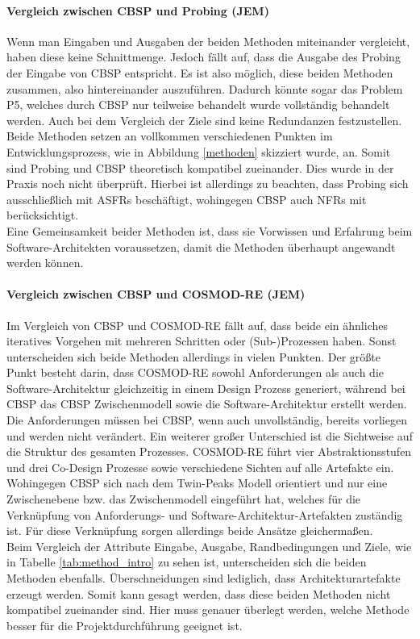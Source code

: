 \paragraph{Vergleich zwischen CBSP und Probing (JEM)}
Wenn man Eingaben und Ausgaben der beiden Methoden miteinander vergleicht, haben diese keine Schnittmenge. Jedoch f\"allt auf, dass die Ausgabe des Probing der Eingabe von CBSP entspricht. Es ist also m\"oglich, diese beiden Methoden zusammen, also hintereinander auszuf\"uhren. Dadurch k\"onnte sogar das Problem P5, welches durch CBSP nur teilweise behandelt wurde vollst\"andig behandelt werden. Auch bei dem Vergleich der Ziele sind keine Redundanzen festzustellen. Beide Methoden setzen an vollkommen verschiedenen Punkten im Entwicklungsprozess, wie in Abbildung \ref{methoden} skizziert wurde, an. Somit sind Probing und CBSP theoretisch kompatibel zueinander. Dies wurde in der Praxis noch nicht \"uberpr\"uft. Hierbei ist allerdings zu beachten, dass Probing sich ausschlie\ss{}lich mit ASFRs besch\"aftigt, wohingegen CBSP auch NFRs mit ber\"ucksichtigt. \\ 

Eine Gemeinsamkeit beider Methoden ist, dass sie Vorwissen und Erfahrung beim Software-Architekten voraussetzen, damit die Methoden \"uberhaupt angewandt werden k\"onnen. \\

\paragraph{Vergleich zwischen CBSP und COSMOD-RE (JEM)}
Im Vergleich von CBSP und COSMOD-RE f\"allt auf, dass beide ein \"ahnliches iteratives Vorgehen mit mehreren Schritten oder (Sub-)Prozessen haben. Sonst unterscheiden sich beide Methoden allerdings in vielen Punkten. Der gr\"o\ss{}te Punkt besteht darin, dass COSMOD-RE sowohl Anforderungen als auch die Software-Architektur gleichzeitig in einem Design Prozess generiert, w\"ahrend bei CBSP das CBSP Zwischenmodell sowie die Software-Architektur erstellt werden. Die Anforderungen m\"ussen bei CBSP, wenn auch unvollst\"andig, bereits vorliegen und werden nicht ver\"andert. Ein weiterer gro\ss{}er Unterschied ist die Sichtweise auf die Struktur des gesamten Prozesses. COSMOD-RE f\"uhrt vier Abstraktionsstufen und drei Co-Design Prozesse sowie verschiedene Sichten auf alle Artefakte ein. Wohingegen CBSP sich nach dem Twin-Peaks Modell orientiert und nur eine Zwischenebene bzw. das Zwischenmodell eingef\"uhrt hat, welches f\"ur die Verkn\"upfung von Anforderungs- und Software-Architektur-Artefakten zust\"andig ist. F\"ur diese Verkn\"upfung sorgen allerdings beide Ans\"atze gleicherma\ss{}en. \\
Beim Vergleich der Attribute Eingabe, Ausgabe, Randbedingungen und Ziele, wie in Tabelle \ref{tab:method_intro} zu sehen ist, unterscheiden sich die beiden Methoden ebenfalls. \"Uberschneidungen sind lediglich, dass Architekturartefakte erzeugt werden. Somit kann gesagt werden, dass diese beiden Methoden nicht kompatibel zueinander sind. Hier muss genauer \"uberlegt werden, welche Methode besser f\"ur die Projektdurchf\"uhrung geeignet ist. \\

